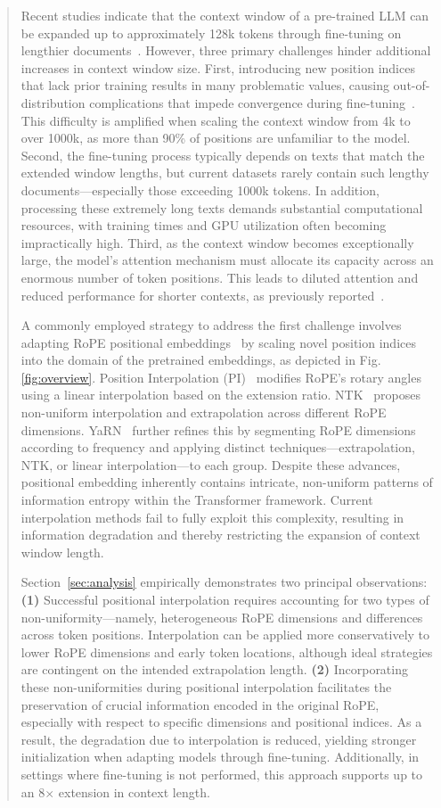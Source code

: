\begin{abstract}
Recent studies indicate that the context window of a pre-trained LLM can be expanded up to approximately 128k tokens through fine-tuning on lengthier documents~\cite{longlora,pi,yarn,zhang2024soaring,liu2023scaling}. However, three primary challenges hinder additional increases in context window size. First, introducing new position indices that lack prior training results in many problematic values, causing out-of-distribution complications that impede convergence during fine-tuning~\cite{pi}. This difficulty is amplified when scaling the context window from 4k to over 1000k, as more than 90\% of positions are unfamiliar to the model. Second, the fine-tuning process typically depends on texts that match the extended window lengths, but current datasets rarely contain such lengthy documents—especially those exceeding 1000k tokens. In addition, processing these extremely long texts demands substantial computational resources, with training times and GPU utilization often becoming impractically high. Third, as the context window becomes exceptionally large, the model’s attention mechanism must allocate its capacity across an enormous number of token positions. This leads to diluted attention and reduced performance for shorter contexts, as previously reported~\cite{pi}.

A commonly employed strategy to address the first challenge involves adapting RoPE positional embeddings~\cite{rope,pi} by scaling novel position indices into the domain of the pretrained embeddings, as depicted in Fig.\ref{fig:overview}. Position Interpolation (PI)~\cite{pi} modifies RoPE's rotary angles using a linear interpolation based on the extension ratio. NTK~\cite{ntk,dynamicntk} proposes non-uniform interpolation and extrapolation across different RoPE dimensions. YaRN~\cite{yarn} further refines this by segmenting RoPE dimensions according to frequency and applying distinct techniques—extrapolation, NTK, or linear interpolation—to each group. Despite these advances, positional embedding inherently contains intricate, non-uniform patterns of information entropy within the Transformer framework. Current interpolation methods fail to fully exploit this complexity, resulting in information degradation and thereby restricting the expansion of context window length.

Section~\ref{sec:analysis} empirically demonstrates two principal observations: \textbf{(1)} Successful positional interpolation requires accounting for two types of non-uniformity—namely, heterogeneous RoPE dimensions and differences across token positions. Interpolation can be applied more conservatively to lower RoPE dimensions and early token locations, although ideal strategies are contingent on the intended extrapolation length. 
\textbf{(2)} Incorporating these non-uniformities during positional interpolation facilitates the preservation of crucial information encoded in the original RoPE, especially with respect to specific dimensions and positional indices. As a result, the degradation due to interpolation is reduced, yielding stronger initialization when adapting models through fine-tuning. Additionally, in settings where fine-tuning is not performed, this approach supports up to an 8$\times$ extension in context length.


\end{abstract}
